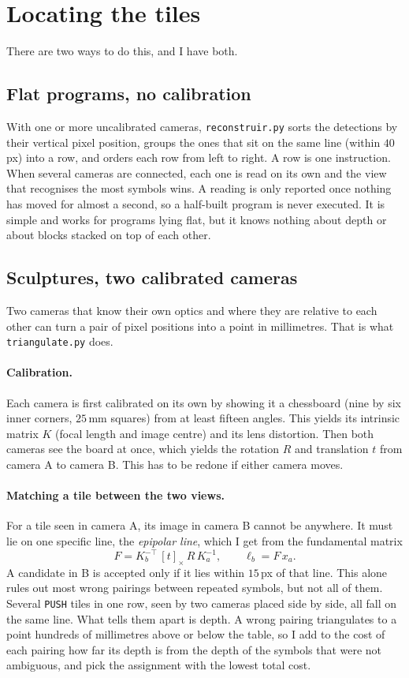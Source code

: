 \documentclass[11pt,a4paper]{article}
\newcommand{\code}[1]{\texttt{#1}}
\begin{document}
\section{Locating the tiles}

There are two ways to do this, and I have both.

\subsection{Flat programs, no calibration}

With one or more uncalibrated cameras, \code{reconstruir.py} sorts the detections by their vertical pixel position, groups the ones that sit on the same line (within $40$\,px) into a row, and orders each row from left to right. A row is one instruction. When several cameras are connected, each one is read on its own and the view that recognises the most symbols wins. A reading is only reported once nothing has moved for almost a second, so a half-built program is never executed. It is simple and works for programs lying flat, but it knows nothing about depth or about blocks stacked on top of each other.

\subsection{Sculptures, two calibrated cameras}

Two cameras that know their own optics and where they are relative to each other can turn a pair of pixel positions into a point in millimetres. That is what \code{triangulate.py} does.

\paragraph{Calibration.} Each camera is first calibrated on its own by showing it a chessboard (nine by six inner corners, $25$\,mm squares) from at least fifteen angles. This yields its intrinsic matrix $K$ (focal length and image centre) and its lens distortion. Then both cameras see the board at once, which yields the rotation $R$ and translation $t$ from camera A to camera B. This has to be redone if either camera moves.

\paragraph{Matching a tile between the two views.} For a tile seen in camera A, its image in camera B cannot be anywhere. It must lie on one specific line, the \emph{epipolar line}, which I get from the fundamental matrix
\[
  F = K_b^{-\top}\,[t]_\times\, R\, K_a^{-1}, \qquad \ell_b = F\,x_a .
\]
A candidate in B is accepted only if it lies within $15$\,px of that line. This alone rules out most wrong pairings between repeated symbols, but not all of them. Several \code{PUSH} tiles in one row, seen by two cameras placed side by side, all fall on the same line. What tells them apart is depth. A wrong pairing triangulates to a point hundreds of millimetres above or below the table, so I add to the cost of each pairing how far its depth is from the depth of the symbols that were not ambiguous, and pick the assignment with the lowest total cost.
\end{document}
